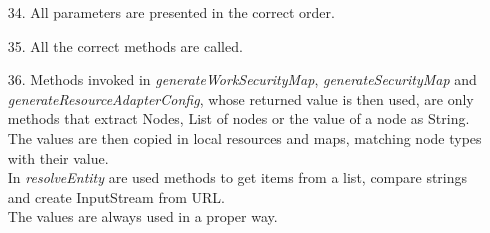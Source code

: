 \begin{itemize}
\item [34.] All parameters are presented in the correct order.
\item [35.] All the correct methods are called.
\item [36.] Methods invoked in \textit{generateWorkSecurityMap}, \textit{generateSecurityMap} and \textit{generateResourceAdapterConfig}, whose returned value is then used, are only methods that extract Nodes, List of nodes or the value of a node as String. The values are then copied in local resources and maps, matching node types with their value.\\ In \textit{resolveEntity} are used methods to get items from a list, compare strings and create InputStream from URL. \\ The values are always used in a proper way.
\end{itemize}